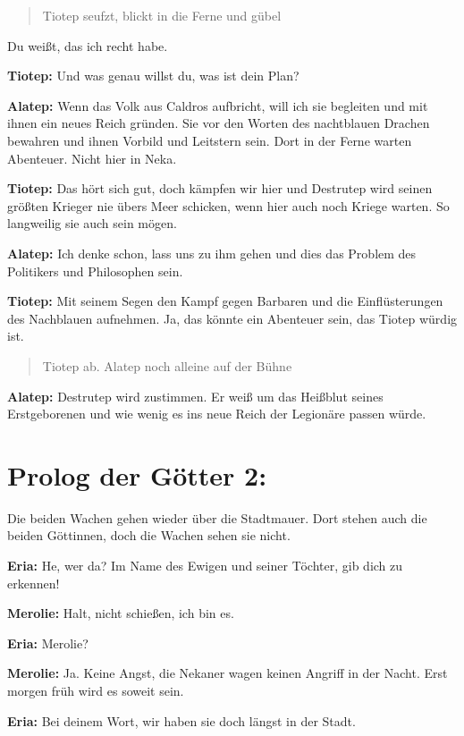 \documentclass[a5paper,6pt]{book}
\begin{document}
\begin{quote}
Tiotep seufzt, blickt in die Ferne und gübel
\end{quote}


Du weißt, das ich recht habe.

\textbf{Tiotep:} Und was genau willst du, was ist dein Plan?

\textbf{Alatep:} Wenn das Volk aus Caldros aufbricht, will ich sie begleiten und mit ihnen ein neues
Reich gründen. Sie vor den Worten des nachtblauen Drachen bewahren und ihnen
Vorbild und Leitstern sein. Dort in der Ferne warten Abenteuer. Nicht hier in Neka.

\textbf{Tiotep:} Das hört sich gut, doch kämpfen wir hier und Destrutep wird seinen größten Krieger
nie übers Meer schicken, wenn hier auch noch Kriege warten. So langweilig sie auch
sein mögen.

\textbf{Alatep:} Ich denke schon, lass uns zu ihm gehen und dies das Problem des Politikers und
Philosophen sein.

\textbf{Tiotep:} Mit seinem Segen den Kampf gegen Barbaren und die Einflüsterungen des
Nachblauen aufnehmen. Ja, das könnte ein Abenteuer sein, das Tiotep würdig ist.

\begin{quote}
Tiotep ab. Alatep noch alleine auf der Bühne
\end{quote}


\textbf{Alatep:} Destrutep wird zustimmen. Er weiß um das Heißblut seines Erstgeborenen und wie
wenig es ins neue Reich der Legionäre passen würde.

\section{Prolog der Götter 2:}

Die beiden Wachen gehen wieder über die Stadtmauer. Dort stehen auch die beiden
Göttinnen, doch die Wachen sehen sie nicht.

\textbf{Eria:} He, wer da? Im Name des Ewigen und seiner Töchter, gib dich zu erkennen!

\textbf{Merolie:} Halt, nicht schießen, ich bin es.

\textbf{Eria:} Merolie?

\textbf{Merolie:} Ja. Keine Angst, die Nekaner wagen keinen Angriff in der Nacht. Erst morgen früh
wird es soweit sein.

\textbf{Eria:} Bei deinem Wort, wir haben sie doch längst in der Stadt.
\end{document}

